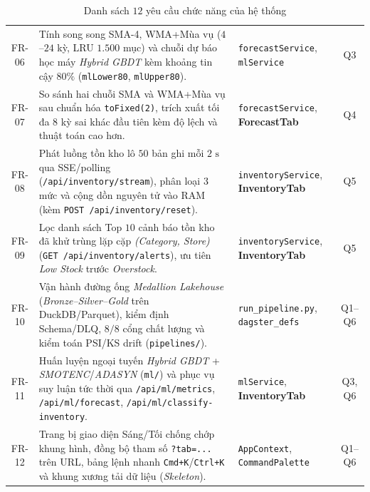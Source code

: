 \begin{table}[H]
\begin{tabular}{c p{9.1cm} p{3.7cm} c}
		FR-06       & Tính song song SMA-4, WMA+Mùa vụ ($4$--$24$ kỳ, LRU $1.500$ mục) và chuỗi dự báo học máy \textit{Hybrid GBDT} kèm khoảng tin cậy $80\%$ (\texttt{mlLower80}, \texttt{mlUpper80}).                                                            & \texttt{forecastService}, \texttt{mlService}        & Q3               \\
		FR-07       & So sánh hai chuỗi SMA và WMA+Mùa vụ sau chuẩn hóa \texttt{toFixed(2)}, trích xuất tối đa $8$ kỳ sai khác đầu tiên kèm độ lệch và thuật toán cao hơn.                                                                                             & \texttt{forecastService}, \textbf{ForecastTab}                      & Q4               \\
		FR-08       & Phát luồng tồn kho lô $50$ bản ghi mỗi $2\text{ s}$ qua SSE/polling (\texttt{/api/inventory/stream}), phân loại $3$ mức và cộng dồn nguyên tử vào RAM (kèm \texttt{POST /api/inventory/reset}).                                        & \texttt{inventoryService}, \textbf{InventoryTab}                    & Q5               \\
		FR-09       & Lọc danh sách Top $10$ cảnh báo tồn kho đã khử trùng lặp cặp \textit{(Category, Store)} (\texttt{GET /api/inventory/alerts}), ưu tiên \textit{Low Stock} trước \textit{Overstock}.                                                                     & \texttt{inventoryService}, \textbf{InventoryTab}                    & Q5               \\
		FR-10       & Vận hành đường ống \textit{Medallion Lakehouse} (\textit{Bronze--Silver--Gold} trên DuckDB/Parquet), kiểm định Schema/DLQ, $8/8$ cổng chất lượng và kiểm toán PSI/KS drift (\texttt{pipelines/}).                                                      & \texttt{run_pipeline.py}, \texttt{dagster_defs}                 & Q1--Q6           \\
		FR-11       & Huấn luyện ngoại tuyến \textit{Hybrid GBDT} + \textit{SMOTENC}/\textit{ADASYN} (\texttt{ml/}) và phục vụ suy luận tức thời qua \texttt{/api/ml/metrics}, \texttt{/api/ml/forecast}, \texttt{/api/ml/classify-inventory}. & \texttt{mlService}, \textbf{InventoryTab}                           & Q3, Q6           \\
		FR-12       & Trang bị giao diện Sáng/Tối chống chớp khung hình, đồng bộ tham số \texttt{?tab=...} trên URL, bảng lệnh nhanh \texttt{Cmd+K}/\texttt{Ctrl+K} và khung xương tải dữ liệu (\textit{Skeleton}).                                                          & \texttt{AppContext}, \texttt{CommandPalette}        & Q1--Q6           \\
		\bottomrule
	\end{tabular}
	\caption{Danh sách $12$ yêu cầu chức năng của hệ thống}
	\label{tab:functional-requirements}
\end{table}

